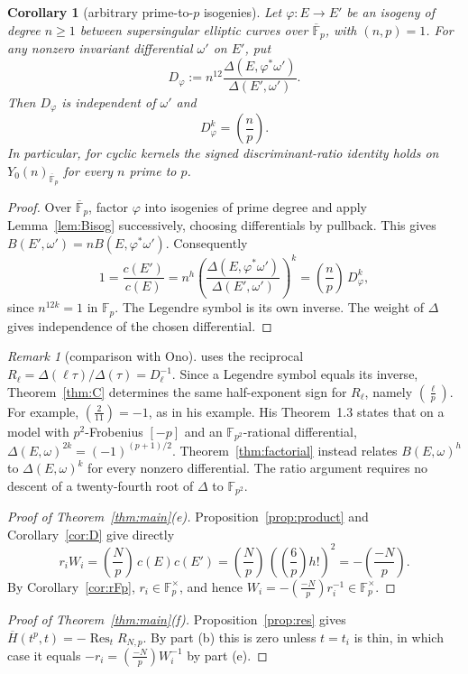 \documentclass[11pt,a4paper]{article}
\numberwithin{equation}{section}
\newtheorem{corollary}[theorem]{Corollary}
\theoremstyle{definition}
\theoremstyle{remark}
\newtheorem{remark}[theorem]{Remark}
\newcommand{\Fp}{\mathbb F_p}
\newcommand{\Fq}{\mathbb F_{p^2}}
\newcommand{\Fb}{\overline{\mathbb F}_p}
\newcommand{\Res}{\operatorname{Res}}
\newcommand{\leg}[2]{\left(\frac{#1}{#2}\right)}
\newcommand{\Lp}[1]{\left(\frac{#1}{p}\right)}
\begin{document}
\begin{corollary}[arbitrary prime-to-$p$ isogenies]\label{cor:degree-n}
Let $\varphi:E\to E'$ be an isogeny of degree $n\ge1$ between
supersingular elliptic curves over $\Fb$, with $(n,p)=1$. For any
nonzero invariant differential $\omega'$ on $E'$, put
\[
D_\varphi:=n^{12}
\frac{\Delta(E,\varphi^*\omega')}{\Delta(E',\omega')}.
\]
Then $D_\varphi$ is independent of $\omega'$ and
\[
D_\varphi^k=\Lp n.
\]
In particular, for cyclic kernels the signed discriminant-ratio
identity holds on $Y_0(n)_{\Fb}$ for every $n$ prime to $p$.
\end{corollary}
\begin{proof}
Over $\Fb$, factor $\varphi$ into isogenies of prime degree and apply
Lemma~\ref{lem:Bisog} successively, choosing differentials by pullback.
This gives $B(E',\omega')=nB(E,\varphi^*\omega')$. Consequently
\[
1=\frac{c(E')}{c(E)}
=n^h\left(\frac{\Delta(E,\varphi^*\omega')}{\Delta(E',\omega')}\right)^k
=\Lp n\,D_\varphi^k,
\]
since $n^{12k}=1$ in $\Fp$. The Legendre symbol is its own inverse.
The weight of $\Delta$ gives independence of the chosen differential.
\end{proof}

\begin{remark}[comparison with Ono]\label{rem:ono}
\citet[Theorem~1.2 and Remark~4]{Ono25} uses the reciprocal
$R_\ell=\Delta(\ell\tau)/\Delta(\tau)=D_\ell^{-1}$.
Since a Legendre symbol equals its inverse, Theorem~\ref{thm:C}
determines the same half-exponent sign for $R_\ell$, namely $\Lp\ell$.
For example, $\leg2{11}=-1$, as in his example.
His Theorem~1.3 states that on a model with $p^2$-Frobenius $[-p]$
and an $\Fq$-rational differential,
$\Delta(E,\omega)^{2k}=(-1)^{(p+1)/2}$.
Theorem~\ref{thm:factorial} instead relates $B(E,\omega)^h$ to
$\Delta(E,\omega)^k$ for every nonzero differential.
The ratio argument requires no descent of a twenty-fourth root of
$\Delta$ to $\Fq$.
\end{remark}

\begin{proof}[Proof of Theorem~\ref{thm:main}(e)]
Proposition~\ref{prop:product} and Corollary~\ref{cor:D} give directly
\[
r_iW_i=\Lp N\,c(E)c(E')
=\Lp N\,(\Lp6h!)^2=-\Lp{-N}.
\]
By Corollary~\ref{cor:rFp}, $r_i\in\Fp^\times$, and hence
$W_i=-\Lp{-N}r_i^{-1}\in\Fp^\times$.
\end{proof}

\begin{proof}[Proof of Theorem~\ref{thm:main}(f)]
Proposition~\ref{prop:res} gives
$\overline H(t^p,t)=-\Res_tR_{N,p}$. By part (b) this is zero
unless $t=t_i$ is thin, in which case it equals
$-r_i=\Lp{-N}W_i^{-1}$ by part (e).
\end{proof}
\end{document}
